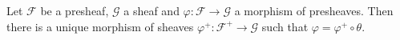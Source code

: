 Let $\mathcal{F}$ be a presheaf, $\mathcal{G}$ a sheaf and $\varphi\colon \mathcal{F}\to \mathcal{G}$
a morphism of presheaves. Then there is a unique morphism of sheaves
$\varphi^+\colon \mathcal{F}^+\to \mathcal{G}$ such that $\varphi = \varphi^+ \circ \theta$.

